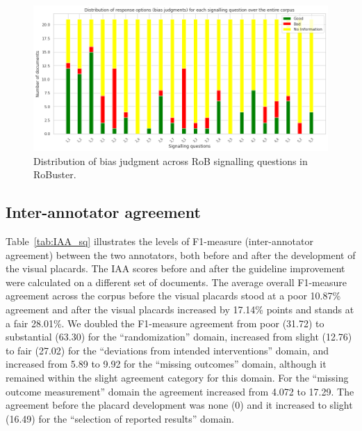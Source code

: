 \documentclass[sn-mathphys,Numbered]{sn-jnl}%
\theoremstyle{thmstyleone}%
\theoremstyle{thmstyletwo}%
\theoremstyle{thmstylethree}%
\begin{document}
%
%
%
\begin{figure}[htb]
    \centering
    \includegraphics[width=0.90\columnwidth]{figures/judgment_dist.png}
    \caption{Distribution of bias judgment across RoB signalling questions in RoBuster.}
    \label{fig:rob_information}
\end{figure}
%
%
%


%
%
%
\subsection{Inter-annotator agreement}
\label{result:iaa}
%
Table~\ref{tab:IAA_sq} illustrates the levels of F1-measure (inter-annotator agreement) between the two annotators, both before and after the development of the visual placards.
The IAA scores before and after the guideline improvement were calculated on a different set of documents.
The average overall F1-measure agreement across the corpus before the visual placards stood at a poor 10.87\% agreement and after the visual placards increased by 17.14\% points and stands at a fair 28.01\%.
We doubled the F1-measure agreement from poor (31.72) to substantial (63.30) for the ``randomization'' domain, increased from slight (12.76) to fair (27.02) for the ``deviations from intended interventions'' domain, and increased from 5.89 to 9.92 for the ``missing outcomes'' domain, although it remained within the slight agreement category for this domain.
For the ``missing outcome measurement'' domain the agreement increased from 4.072 to 17.29.
The agreement before the placard development was none (0) and it increased to slight (16.49) for the ``selection of reported results'' domain.
\end{document}
